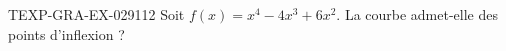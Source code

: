 \begin{exercice}{TEXP-GRA-EX-029}{1}{12}
Soit $f(x) = x^4 - 4x^3 + 6x^2$. La courbe admet-elle des points d'inflexion ?

\end{exercice}
